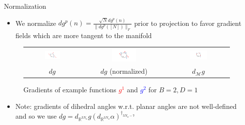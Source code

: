 \begin{frame}{Normalization}
\begin{itemize}
    \item We normalize $d g^p(n)= \frac{\sqrt{N} d g^p(n)}{  \|d g^p([N])\|_F}$ prior to projection to favor gradient fields which are more tangent to the manifold
\end{itemize}
\begin{figure}[!htp]
    \centering
    \begin{tabular}{ccc}
        \includegraphics[width=0.3\textwidth, trim={3cm 2cm 5cm 3cm}, clip]{img/raw.png} &
        \includegraphics[width=0.3\textwidth, trim={3cm 2cm 5cm 3cm}, clip]{img/norm.png} &
          \includegraphics[width=0.3\textwidth, trim={3cm 2cm 5cm 3cm}, clip]{img/proj.png}  \\
           \centering
        $dg$ &
         \centering
       $dg$ (normalized) &
        \centering
        $d_{\mathcal M} g$
    \end{tabular}
    \caption*{Gradients of example functions \textcolor{red}{$g^1$} and \textcolor{blue}{$g^2$} for $B = 2, D = 1$}
\end{figure}
\begin{itemize}
    \item Note: gradients of dihedral angles w.r.t. planar angles are not well-defined and so we use $dg = d_{\mathbb R^{3N_a}} g (d_{\mathbb R^{3N_a}} \alpha)^{\dagger_{3N_a - 7}}$
\end{itemize}
\end{frame}

